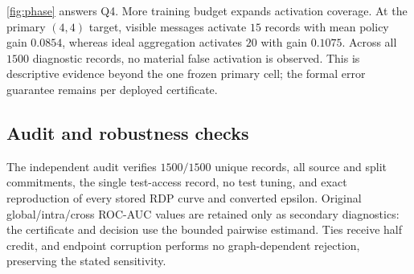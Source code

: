 \cref{fig:phase} answers Q4. More training budget expands activation coverage.
At the primary $(4,4)$ target, visible messages activate $15$ records with
mean policy gain $0.0854$, whereas ideal aggregation activates $20$ with gain
$0.1075$. Across all $1500$ diagnostic records, no material false activation
is observed. This is descriptive evidence beyond the one frozen primary cell;
the formal error guarantee remains per deployed certificate.

\subsection{Audit and robustness checks}

The independent audit verifies $1500/1500$ unique records, all source and
split commitments, the single test-access record, no test tuning, and exact
reproduction of every stored RDP curve and converted epsilon. Original
global/intra/cross ROC-AUC values are retained only as secondary diagnostics:
the certificate and decision use the bounded pairwise estimand. Ties receive
half credit, and endpoint corruption performs no graph-dependent rejection,
preserving the stated sensitivity.
